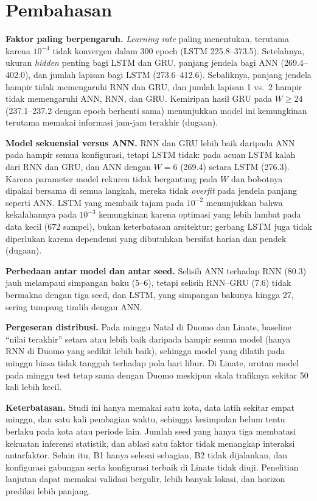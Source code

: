 \documentclass[conference,a4paper]{IEEEtran}
\begin{document}
\section{Pembahasan}
\textbf{Faktor paling berpengaruh.} \textit{Learning rate} paling menentukan, terutama karena $10^{-4}$ tidak konvergen dalam 300 epoch (LSTM 225.8--373.5). Setelahnya, ukuran \textit{hidden} penting bagi LSTM dan GRU, panjang jendela bagi ANN (269.4--402.0), dan jumlah lapisan bagi LSTM (273.6--412.6). Sebaliknya, panjang jendela hampir tidak memengaruhi RNN dan GRU, dan jumlah lapisan 1 vs.\ 2 hampir tidak memengaruhi ANN, RNN, dan GRU. Kemiripan hasil GRU pada $W\ge24$ (237.1--237.2 dengan epoch berhenti sama) menunjukkan model ini kemungkinan terutama memakai informasi jam-jam terakhir (dugaan).
 
\textbf{Model sekuensial versus ANN.} RNN dan GRU lebih baik daripada ANN pada hampir semua konfigurasi, tetapi LSTM tidak: pada acuan LSTM kalah dari RNN dan GRU, dan ANN dengan $W{=}6$ (269.4) setara LSTM (276.3). Karena parameter model rekuren tidak bergantung pada $W$ dan bobotnya dipakai bersama di semua langkah, mereka tidak \textit{overfit} pada jendela panjang seperti ANN. LSTM yang membaik tajam pada $10^{-2}$ menunjukkan bahwa kekalahannya pada $10^{-3}$ kemungkinan karena optimasi yang lebih lambat pada data kecil (672 sampel), bukan keterbatasan arsitektur; gerbang LSTM juga tidak diperlukan karena dependensi yang dibutuhkan bersifat harian dan pendek (dugaan).
 
\textbf{Perbedaan antar model dan antar seed.} Selisih ANN terhadap RNN (80.3) jauh melampaui simpangan baku (5--6), tetapi selisih RNN--GRU (7.6) tidak bermakna dengan tiga seed, dan LSTM, yang simpangan bakunya hingga 27, sering tumpang tindih dengan ANN.
 
\textbf{Pergeseran distribusi.} Pada minggu Natal di Duomo dan Linate, baseline ``nilai terakhir'' setara atau lebih baik daripada hampir semua model (hanya RNN di Duomo yang sedikit lebih baik), sehingga model yang dilatih pada minggu biasa tidak tangguh terhadap pola hari libur. Di Linate, urutan model pada minggu test tetap sama dengan Duomo meskipun skala trafiknya sekitar 50 kali lebih kecil.
 
\textbf{Keterbatasan.} Studi ini hanya memakai satu kota, data latih sekitar empat minggu, dan satu kali pembagian waktu, sehingga kesimpulan belum tentu berlaku pada kota atau periode lain. Jumlah seed yang hanya tiga membatasi kekuatan inferensi statistik, dan ablasi satu faktor tidak menangkap interaksi antarfaktor. Selain itu, B1 hanya selesai sebagian, B2 tidak dijalankan, dan konfigurasi gabungan serta konfigurasi terbaik di Linate tidak diuji. Penelitian lanjutan dapat memakai validasi bergulir, lebih banyak lokasi, dan horizon prediksi lebih panjang.
 
\end{document}
